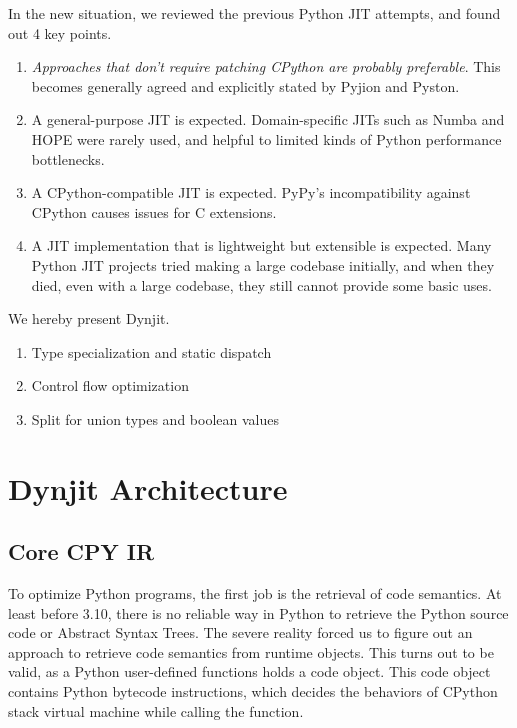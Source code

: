 \documentclass[conference]{IEEEtran}
\begin{document}
In the new situation, we reviewed the previous Python JIT attempts, and found out 4 key points.
\begin{enumerate}
    \item \textit{Approaches that don't require patching CPython are probably preferable}. This becomes generally agreed and explicitly stated by Pyjion and Pyston.
    \item A general-purpose JIT is expected. Domain-specific JITs such as Numba and HOPE were rarely used,  and helpful to limited kinds of Python performance bottlenecks. 
    \item A CPython-compatible JIT is expected. PyPy's incompatibility against CPython causes issues for C extensions.
    \item A JIT implementation that is lightweight but extensible is expected. Many Python JIT projects tried making a large codebase initially,
    and when they died, even with a large codebase, they still cannot provide some basic uses. 
\end{enumerate}

We hereby present Dynjit.

\begin{enumerate}
    \item Type specialization and static dispatch
    \item Control flow optimization
    \item Split for union types and boolean values
\end{enumerate}

\section{Dynjit Architecture}

\subsection{Core CPY IR}

To optimize Python programs, the first job is the retrieval of code semantics.
At least before 3.10, there is no reliable way in Python to retrieve the Python source code or Abstract Syntax Trees.
The severe reality forced us to figure out an approach to retrieve code semantics from runtime objects.
This turns out to be valid, as a Python user-defined functions holds a code object. This code object contains Python bytecode
instructions, which decides the behaviors of CPython stack virtual machine while calling the function.
\end{document}
